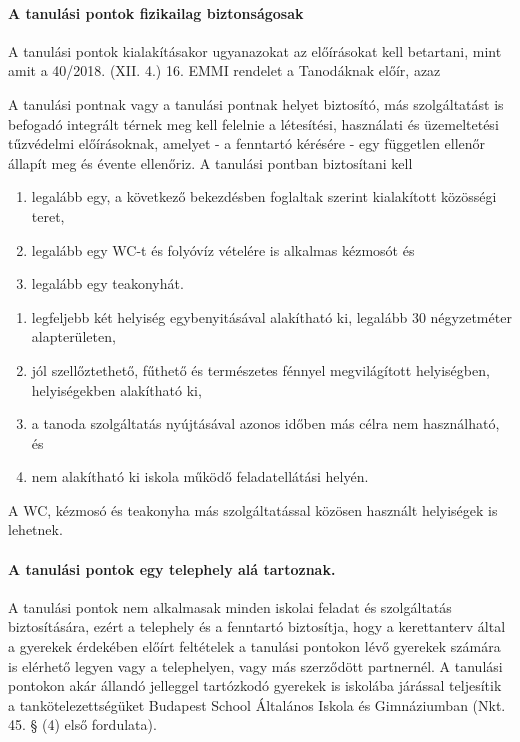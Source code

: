 \paragraph{A tanulási pontok fizikailag biztonságosak}
A tanulási pontok kialakításakor ugyanazokat az előírásokat kell betartani, mint amit a 40/2018. (XII. 4.) 16. EMMI rendelet a Tanodáknak előír, azaz

A tanulási pontnak vagy a tanulási pontnak helyet biztosító, más szolgáltatást is befogadó integrált térnek meg kell felelnie a létesítési, használati és üzemeltetési tűzvédelmi előírásoknak, amelyet - a fenntartó kérésére - egy független ellenőr állapít meg és évente ellenőriz. A tanulási pontban biztosítani kell
\begin{enumerate}
    \item legalább egy, a következő bekezdésben foglaltak szerint kialakított közösségi teret,
    \item legalább egy WC-t és folyóvíz vételére is alkalmas kézmosót és
    \item  legalább egy teakonyhát.
\end{enumerate}
\begin{enumerate}
    \item legfeljebb két helyiség egybenyitásával alakítható ki, legalább 30 négyzetméter alapterületen,
    \item jól szellőztethető, fűthető és természetes fénnyel megvilágított helyiségben, helyiségekben alakítható ki,
    \item a tanoda szolgáltatás nyújtásával azonos időben más célra nem használható, és
    \item nem alakítható ki iskola működő feladatellátási helyén.
\end{enumerate}

A WC, kézmosó és teakonyha más szolgáltatással közösen használt helyiségek is lehetnek.

\paragraph{A tanulási pontok egy telephely alá tartoznak.}

A tanulási pontok nem alkalmasak minden iskolai feladat és szolgáltatás biztosítására, ezért a telephely és a fenntartó biztosítja, hogy a kerettanterv által a gyerekek érdekében előírt feltételek a tanulási pontokon lévő gyerekek számára is elérhető legyen vagy a telephelyen, vagy más szerződött partnernél. A tanulási pontokon akár állandó jelleggel tartózkodó gyerekek is iskolába járással teljesítik a tankötelezettségüket Budapest School Általános Iskola és Gimnáziumban (Nkt. 45. § (4) első fordulata).

